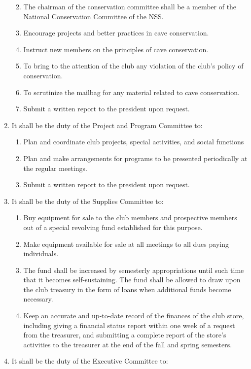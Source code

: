 \documentclass[
]{article}
\providecommand{\tightlist}{%
  \setlength{\itemsep}{0pt}\setlength{\parskip}{0pt}}
\begin{document}
\begin{enumerate}
  \begin{enumerate}
  \def\labelenumii{\Alph{enumii}.}
  \tightlist
  \item
    The chairman of the conservation committee shall be a member of the
    National Conservation Committee of the NSS.
  \item
    Encourage projects and better practices in cave conservation.
  \item
    Instruct new members on the principles of cave conservation.
  \item
    To bring to the attention of the club any violation of the club's
    policy of conservation.
  \item
    To scrutinize the mailbag for any material related to cave
    conservation.
  \item
    Submit a written report to the president upon request.
  \end{enumerate}
\item
  It shall be the duty of the Project and Program Committee to:

  \begin{enumerate}
  \def\labelenumii{\Alph{enumii}.}
  \tightlist
  \item
    Plan and coordinate club projects, special activities, and social
    functions
  \item
    Plan and make arrangements for programs to be presented periodically
    at the regular meetings.
  \item
    Submit a written report to the president upon request.
  \end{enumerate}
\item
  It shall be the duty of the Supplies Committee to:

  \begin{enumerate}
  \def\labelenumii{\Alph{enumii}.}
  \tightlist
  \item
    Buy equipment for sale to the club members and prospective members
    out of a special revolving fund established for this purpose.
  \item
    Make equipment available for sale at all meetings to all dues paying
    individuals.
  \item
    The fund shall be increased by semesterly appropriations until such
    time that it becomes self-sustaining. The fund shall be allowed to
    draw upon the club treasury in the form of loans when additional
    funds become necessary.
  \item
    Keep an accurate and up-to-date record of the finances of the club
    store, including giving a financial status report within one week of
    a request from the treasurer, and submitting a complete report of
    the store's activities to the treasurer at the end of the fall and
    spring semesters.
  \end{enumerate}
\item
  It shall be the duty of the Executive Committee to:


\end{enumerate}
\end{document}
